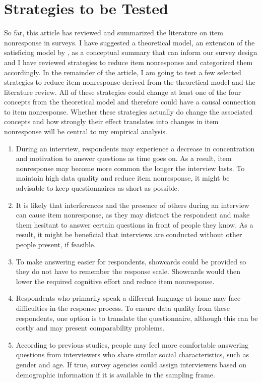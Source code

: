 \documentclass[a4paper,12pt]{article}
\begin{document}
\section{Strategies to be Tested}

So far, this article has reviewed and summarized the literature on item nonresponse in surveys. I have suggested a theoretical model, an extension of the satisficing model by \citet{krosnickResponseStrategiesCoping1991}, as a conceptual summary that can inform our survey design and I have reviewed strategies to reduce item nonresponse and categorized them accordingly. In the remainder of the article, I am going to test a few selected strategies to reduce item nonresponse derived from the theoretical model and the literature review. All of these strategies could change at least one of the four concepts from the theoretical model and therefore could have a causal connection to item nonresponse. Whether these strategies actually do change the associated concepts and how strongly their effect translates into changes in item nonresponse will be central to my empirical analysis.

\begin{enumerate}
 \item During an interview, respondents may experience a decrease in concentration and motivation to answer questions as time goes on. As a result, item nonresponse may become more common the longer the interview lasts. To maintain high data quality and reduce item nonresponse, it might be advisable to keep questionnaires as short as possible.

 \item It is likely that interferences and the presence of others during an interview can cause item nonresponse, as they may distract the respondent and make them hesitant to answer certain questions in front of people they know. As a result, it might be beneficial that interviews are conducted without other people present, if feasible.

 \item To make answering easier for respondents, showcards could be provided so they do not have to remember the response scale. Showcards would then lower the required cognitive effort and reduce item nonresponse.

 \item Respondents who primarily speak a different language at home may face difficulties in the response process. To ensure data quality from these respondents, one option is to translate the questionnaire, although this can be costly and may present comparability problems.

 \item According to previous studies, people may feel more comfortable answering questions from interviewers who share similar social characteristics, such as gender and age. If true, survey agencies could assign interviewers based on demographic information if it is available in the sampling frame.
\end{enumerate}
\end{document}
